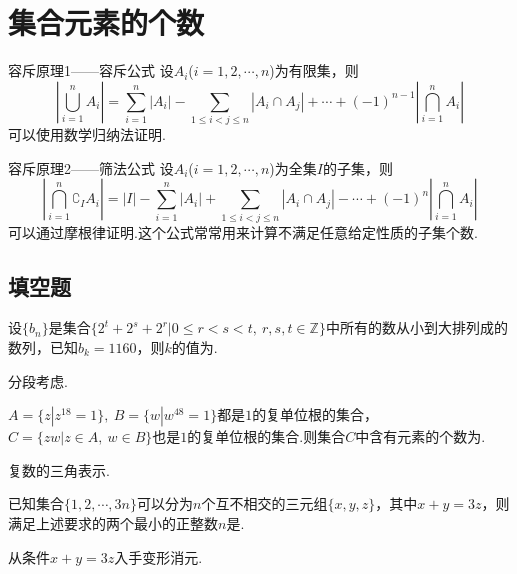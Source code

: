 \documentclass[lang=cn, zihao=4.5]{elegantbook}
\newcommand{\tk}{\uline{\hspace{4em}}}
\begin{document}
\newpage
\section{集合元素的个数}

\begin{theorem}{容斥原理1——容斥公式}
	设$A_i$($i=1,2, \cdots ,n$)为有限集，则
	$$|\bigcup_{i=1}^{n} A_i| = \sum_{i=1}^{n} |A_i|-\sum_{1 \leq i < j \leq n}|A_i \cap A_j| + \cdots + (-1)^{n-1} |\bigcap_{i=1}^{n} A_i|$$
	可以使用数学归纳法证明.
\end{theorem}

\begin{theorem}{容斥原理2——筛法公式}
	设$A_i$($i=1,2, \cdots ,n$)为全集$I$的子集，则
	$$|\bigcap_{i=1}^{n} \complement _{I} A_i| = |I| - \sum_{i=1}^{n} |A_i|+\sum_{1 \leq i < j \leq n}|A_i \cap A_j| - \cdots + (-1)^{n} |\bigcap_{i=1}^{n} A_i|$$
	可以通过摩根律证明.这个公式常常用来计算不满足任意给定性质的子集个数.
\end{theorem}

\subsection*{填空题}

\begin{example} %
	设$\{ b_n \}$是集合$\{ 2^t+2^s+2^r | 0 \leq r < s < t, ~r,s,t \in \mathbb{Z} \}$中所有的数从小到大排列成的数列，已知$b_k = 1160$，则$k$的值为\tk .
\end{example}
\begin{hint}
	分段考虑.
\end{hint}

\begin{example} %
	$A=\{ z|z^{18}=1 \},~ B=\{ w|w^{48}=1 \}$都是$1$的复单位根的集合，$C=\{ zw|z \in A,~ w \in B \}$也是$1$的复单位根的集合.则集合$C$中含有元素的个数为\tk .
\end{example}
\begin{hint}
	复数的三角表示.
\end{hint}

\begin{example} %
	已知集合$\{ 1,2, \cdots ,3n \}$可以分为$n$个互不相交的三元组$\{ x,y,z \}$，其中$x+y=3z$，则满足上述要求的两个最小的正整数$n$是\tk .
\end{example}
\begin{hint}
	从条件$x+y=3z$入手变形消元.
\end{hint}
\end{document}
